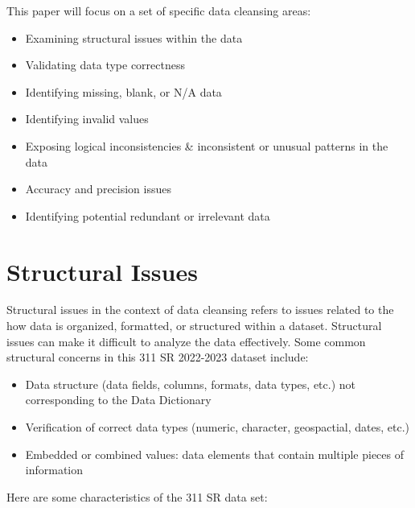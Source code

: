 \documentclass[12pt, titlepage]{article}
\begin{document}
This paper will focus on a set of specific data cleansing areas:

\begin{itemize}
	\item Examining structural issues within the data
	\item Validating data type correctness
	\item Identifying missing, blank, or N/A data
	\item Identifying invalid values
	\item Exposing logical inconsistencies \& inconsistent or unusual patterns in the data
	\item Accuracy and precision issues
	\item Identifying potential redundant or irrelevant data  
\end{itemize}



\section{Structural Issues}\label{sec:structural}

Structural issues in the context of data cleansing refers to issues related to the how data is organized, formatted, or structured within a dataset. Structural issues 
can make it difficult to analyze the data effectively. Some common structural concerns in this 311 SR 2022-2023 dataset include:

\begin{itemize}
	\item Data structure (data fields, columns, formats, data types, etc.) not corresponding to the Data Dictionary
	\item Verification of correct data types (numeric, character, geospactial, dates, etc.)
	\item Embedded or combined values: data elements that contain multiple pieces of information 
\end{itemize}

Here are some characteristics of the 311 SR data set:
\end{document}
